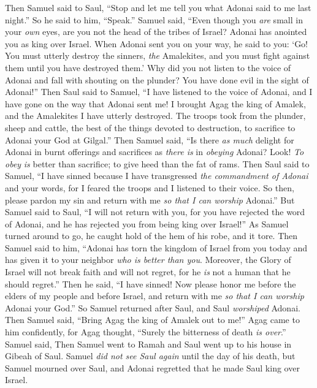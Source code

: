 \begin{biblechapter}
\verse Then Samuel said to Saul, “Stop and let me tell you what Adonai said to me last night.” So he said to him, “Speak.”
\verse Samuel said, “Even though you \textit{are} small in your \textit{own} eyes, are you not the head of the tribes of Israel? Adonai has anointed you as king over Israel.
\verse When Adonai sent you on your way, he said to you: ‘Go! You must utterly destroy the sinners, \textit{the} Amalekites, and you must fight against them until you have destroyed them.’
\verse Why did you not listen to the voice of Adonai and fall with shouting on the plunder? You have done evil in the sight of Adonai!”
\verse Then Saul said to Samuel, “I have listened to the voice of Adonai, and I have gone on the way that Adonai sent me! I brought Agag the king of Amalek, and the Amalekites I have utterly destroyed.
\verse The troops took from the plunder, sheep and cattle, the best of the things devoted to destruction, to sacrifice to Adonai your God at Gilgal.”
\verse Then Samuel said,
\verse “Is there \textit{as much} delight for Adonai in burnt offerings and sacrifices 
as \textit{there is} in \textit{obeying} Adonai? 
Look! \textit{To obey} \textit{is} better than sacrifice; 
to give heed than the fat of rams.
\verse Then Saul said to Samuel, “I have sinned because I have transgressed \textit{the commandment of Adonai} and your words, for I feared the troops and I listened to their voice.
\verse So then, please pardon my sin and return with me \textit{so that I can worship} Adonai.”
\verse But Samuel said to Saul, “I will not return with you, for you have rejected the word of Adonai, and he has rejected you from being king over Israel!”
\verse As Samuel turned around to go, he caught hold of the hem of his robe, and it tore.
\verse Then Samuel said to him, “Adonai has torn the kingdom of Israel from you today and has given it to your neighbor \textit{who is better than you}.
\verse Moreover, the Glory of Israel will not break faith and will not regret, for he \textit{is} not a human that he should regret.”
\verse Then he said, “I have sinned! Now please honor me before the elders of my people and before Israel, and return with me \textit{so that I can worship} Adonai your God.”
\verse So Samuel returned after Saul, and Saul \textit{worshiped} Adonai.
\verse Then Samuel said, “Bring Agag the king of Amalek out to me!” Agag came to him confidently, for Agag thought, “Surely the bitterness of death \textit{is over}.”
\verse Samuel said,
\verse Then Samuel went to Ramah and Saul went up to his house in Gibeah of Saul.
\verse Samuel \textit{did not see Saul again} until the day of his death, but Samuel mourned over Saul, and Adonai regretted that he made Saul king over Israel.
\end{biblechapter}

